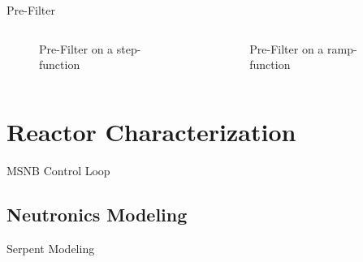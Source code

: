 \documentclass[aspectratio=169,pdftex,dvipsnames]{beamer}
\begin{document}
\begin{frame}{Pre-Filter}
    \begin{columns}
        \begin{column}{0.5\textwidth}
            \begin{figure}
                \resizebox{\textwidth}{!}{}
                \caption{Pre-Filter on a step-function}
            \end{figure}
        \end{column}
        \begin{column}{0.5\textwidth}
            \begin{figure}
                \resizebox{\textwidth}{!}{}
                \caption{Pre-Filter on a ramp-function}
            \end{figure}
        \end{column}
    \end{columns}
\end{frame}

\section{Reactor Characterization}
\begin{frame}{MSNB Control Loop}
    \begin{figure}[!ht]
        \centering
        \resizebox{\textwidth}{!}{}
    \end{figure}
\end{frame}

\subsection{Neutronics Modeling}
\begin{frame}{Serpent Modeling}
    \begin{figure}[!ht]
        \centering
        \resizebox{\textwidth}{!}{}
    \end{figure}
\end{frame}
\end{document}
